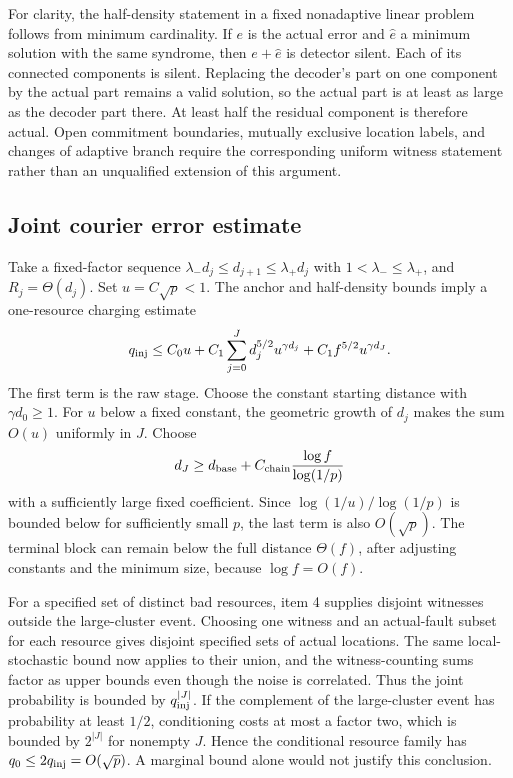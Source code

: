 For clarity, the half-density statement in a fixed nonadaptive linear
problem follows from minimum cardinality. If $e$ is the actual error and
$\widehat e$ a minimum solution with the same syndrome, then
$e+\widehat e$ is detector silent. Each of its connected components is
silent. Replacing the decoder's part on one component by the actual part
remains a valid solution, so the actual part is at least as large as the
decoder part there. At least half the residual component is therefore
actual. Open commitment boundaries, mutually exclusive location labels,
and changes of adaptive branch require the corresponding uniform witness
statement rather than an unqualified extension of this argument.

\subsection{Joint courier error estimate}
Take a fixed-factor sequence
$\lambda_-d_j\le d_{j+1}\le\lambda_+d_j$ with $1<\lambda_-\le\lambda_+$,
and $R_j=\Theta(d_j)$. Set $u=C\sqrt p<1$. The anchor and half-density
bounds imply a one-resource charging estimate
\begin{equation}
 q_{\rm inj}\le C_0u+
 C_1\sum_{j=0}^{J}d_j^{5/2}u^{\gamma d_j}
 +C_1f^{5/2}u^{\gamma d_J}.
 \label{eq:courier-sum-final}
\end{equation}
The first term is the raw stage. Choose the constant starting distance
with $\gamma d_0\ge1$. For $u$ below a fixed constant, the geometric
growth of $d_j$ makes the sum $O(u)$ uniformly in $J$. Choose
\begin{equation}
 d_J\ge d_{\rm base}
      +C_{\rm chain}\frac{\log f}{\log(1/p)}
\end{equation}
with a sufficiently large fixed coefficient. Since
$\log(1/u)/\log(1/p)$ is bounded below for sufficiently small $p$,
the last term is also $O(\sqrt p)$. The terminal block can remain below
the full distance $\Theta(f)$, after adjusting constants and the minimum
size, because $\log f=O(f)$.

For a specified set of distinct bad resources, item 4 supplies disjoint
witnesses outside the large-cluster event. Choosing one witness and an
actual-fault subset for each resource gives disjoint specified sets of
actual locations. The same local-stochastic bound now applies to their
union, and the witness-counting sums factor as upper bounds even though
the noise is correlated. Thus the joint probability is bounded by
$q_{\rm inj}^{|J|}$. If the complement of the large-cluster event has
probability at least $1/2$, conditioning costs at most a factor two,
which is bounded by $2^{|J|}$ for nonempty $J$. Hence the conditional
resource family has $q_0\le2q_{\rm inj}=O(\sqrt p)$. A marginal
bound alone would not justify this conclusion.

